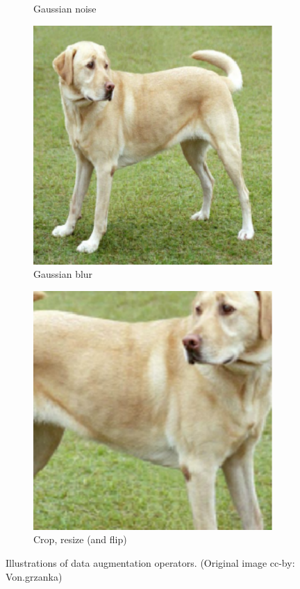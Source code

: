 \begin{figure}[th]
\begin{subfigure}{.19\textwidth}
  \caption{Gaussian noise}
\end{subfigure}\begin{subfigure}{.19\textwidth}
  \centering
  \includegraphics[width=0.9\linewidth]{chapters/assets/ssl_figs/transforms/img_gblur.pdf}
  \caption{Gaussian blur}
\end{subfigure}\begin{subfigure}{.19\textwidth}
  \centering
  \includegraphics[width=0.9\linewidth]{chapters/assets/ssl_figs/transforms/img_crop.pdf}
  \caption{Crop, resize (and flip)}
\end{subfigure}\vskip -0.05in
\caption{Illustrations of data augmentation operators. (Original image cc-by: Von.grzanka)}
\label{fig:simclr-data_aug}
\end{figure}

